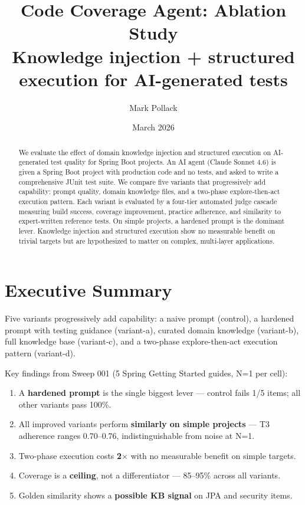 \documentclass[11pt,a4paper]{article}
\title{Code Coverage Agent: Ablation Study\\
\large Knowledge injection + structured execution for AI-generated tests}
\author{Mark Pollack}
\date{March 2026}
\begin{document}
\maketitle

\begin{abstract}
We evaluate the effect of domain knowledge injection and structured execution
on AI-generated test quality for Spring Boot projects. An AI agent (Claude Sonnet 4.6)
is given a Spring Boot project with production code and no tests, and asked to write
a comprehensive JUnit test suite. We compare five variants that progressively add
capability: prompt quality, domain knowledge files, and a two-phase explore-then-act
execution pattern. Each variant is evaluated by a four-tier automated judge cascade
measuring build success, coverage improvement, practice adherence, and similarity
to expert-written reference tests. On simple projects, a hardened prompt is the
dominant lever. Knowledge injection and structured execution show no measurable
benefit on trivial targets but are hypothesized to matter on complex, multi-layer
applications.
\end{abstract}

\tableofcontents
\newpage

\section{Executive Summary}

Five variants progressively add capability: a naive prompt (control), a hardened
prompt with testing guidance (variant-a), curated domain knowledge (variant-b),
full knowledge base (variant-c), and a two-phase explore-then-act execution
pattern (variant-d).

Key findings from Sweep 001 (5 Spring Getting Started guides, N=1 per cell):

\begin{enumerate}
  \item A \textbf{hardened prompt} is the single biggest lever --- control fails 1/5 items; all other variants pass 100\%.
  \item All improved variants perform \textbf{similarly on simple projects} --- T3 adherence ranges 0.70--0.76, indistinguishable from noise at N=1.
  \item Two-phase execution costs \textbf{2$\times$} with no measurable benefit on simple targets.
  \item Coverage is a \textbf{ceiling}, not a differentiator --- 85--95\% across all variants.
  \item Golden similarity shows a \textbf{possible KB signal} on JPA and security items.
\end{enumerate}
\end{document}
